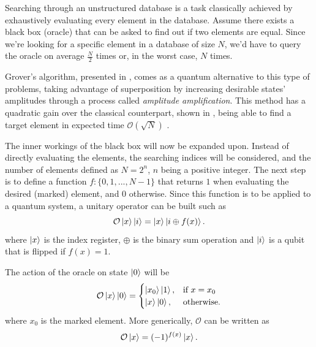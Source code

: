 \documentclass[../../dissertation.tex]{subfiles}
\begin{document}
Searching through an unstructured database is a task classically achieved by
exhaustively evaluating every element in the database. Assume there exists a
black box (oracle) that can be asked to find out if two elements are equal.
Since we're looking for a specific element in a database of size $N$, we'd have
to query the oracle on average $\frac{N}{2}$ times or, in the worst case, $N$ times.\par 

Grover's algorithm, presented in \cite{grover1996}, comes as a
quantum alternative to this type of problems, taking advantage of superposition
by increasing desirable states' amplitudes through a process called
\textit{amplitude amplification}. This method has a quadratic gain over the
classical counterpart, shown in \cite{boyer1996}, being able to find a target element in
expected time $\mathcal{O}(\sqrt{N})$ .\par

The inner workings of the black box will now be expanded upon. Instead of
directly evaluating the elements, the searching indices will be considered,
and the number of elements defined as $N=2^{n}$, $n$ being a positive
integer. The next step is to define a function $f : \{0,1,...,N-1\}$ that
returns $1$ when evaluating the desired (marked) element, and $0$ otherwise.
Since this function is to be applied to a quantum system, a unitary operator
can be built such as 
\begin{equation}
	\mathcal{O}\ket{x}\ket{i} = \ket{x}\ket{i\oplus f(x)} .
\end{equation}
where $\ket{x}$ is the index register, $\oplus$ is the binary sum operation and
$\ket{i}$ is a qubit that is flipped if $f(x)=1$.\par 

The action of the oracle on state $\ket{0}$ will be
\begin{equation}
	\mathcal{O}\ket{x}\ket{0} = \begin{cases} \ket{x_0}\ket{1}, & \mbox{if } x = x_0 \\ \ket{x}\ket{0}, & \mbox{otherwise.} \end{cases}
\end{equation}
where $x_0$ is the marked element. More generically, $\mathcal{O}$ can be
written as 
\begin{equation}
	\mathcal{O}\ket{x} = (-1)^{f(x)}\ket{x} .
\end{equation}\par
\end{document}
